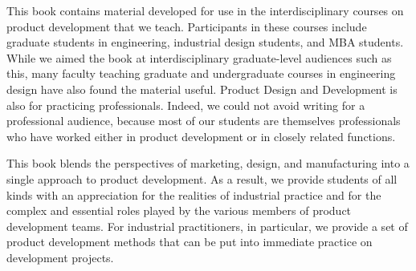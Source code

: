 
\begin{acknowledgements}
This book contains material developed for use
in the interdisciplinary courses on product development that we teach.
Participants in these courses include graduate students in engineering,
industrial design students, and MBA students. While we
aimed the book at interdisciplinary graduate-level audiences such
as this, many faculty teaching graduate and undergraduate courses
in engineering design have also found the material useful. Product
Design and Development is also for practicing professionals. Indeed,
we could not avoid writing  for  a  professional  audience,
because  most  of  our  students  are  themselves professionals who have worked
either in product development or in closely related functions.

This book blends the perspectives of marketing, design, and manufacturing into
a single approach to product development. As a result, we provide students
of all kinds with an appreciation for the realities of industrial practice
and for the complex and essential roles played by the various members of
product development teams. For industrial practitioners, in  particular,
we  provide  a  set  of  product  development  methods  that  can  be
put  into immediate practice on development projects.
\end{acknowledgements}
